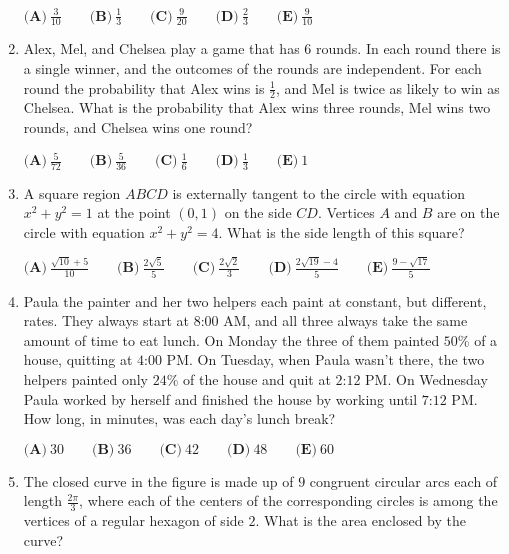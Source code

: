 \documentclass{article}
\begin{document}
\begin{enumerate}[label=\arabic*., itemsep=0.5em]
$ \textbf{(A)}\ \frac{3}{10}\qquad\textbf{(B)}\ \frac{1}{3}\qquad\textbf{(C)}\ \frac{9}{20}\qquad\textbf{(D)}\ \frac{2}{3}\qquad\textbf{(E)}\ \frac{9}{10} $\par \vspace{0.5em}\item Alex, Mel, and Chelsea play a game that has $6$ rounds.  In each round there is a single winner, and the outcomes of the rounds are independent.  For each round the probability that Alex wins is $\frac{1}{2}$, and Mel is twice as likely to win as Chelsea.  What is the probability that Alex wins three rounds, Mel wins two rounds, and Chelsea wins one round?

$ \textbf{(A)}\ \frac{5}{72}\qquad\textbf{(B)}\ \frac{5}{36}\qquad\textbf{(C)}\ \frac{1}{6}\qquad\textbf{(D)}\ \frac{1}{3}\qquad\textbf{(E)}\ 1 $\par \vspace{0.5em}\item A square region $ABCD$ is externally tangent to the circle with equation $x^2+y^2=1$ at the point $(0,1)$ on the side $CD$.  Vertices $A$ and $B$ are on the circle with equation $x^2+y^2=4$.  What is the side length of this square?

$ \textbf{(A)}\ \frac{\sqrt{10}+5}{10}\qquad\textbf{(B)}\ \frac{2\sqrt{5}}{5}\qquad\textbf{(C)}\ \frac{2\sqrt{2}}{3}\qquad\textbf{(D)}\ \frac{2\sqrt{19}-4}{5}\qquad\textbf{(E)}\ \frac{9-\sqrt{17}}{5} $\par \vspace{0.5em}\item Paula the painter and her two helpers each paint at constant, but different, rates.  They always start at $\text{8:00 AM}$, and all three always take the same amount of time to eat lunch.  On Monday the three of them painted $50\%$ of a house, quitting at $\text{4:00 PM}$.  On Tuesday, when Paula wasn't there, the two helpers painted only $24\%$ of the house and quit at $\text{2:12 PM}$.  On Wednesday Paula worked by herself and finished the house by working until $\text{7:12 PM}$.  How long, in minutes, was each day's lunch break?

$ \textbf{(A)}\ 30
\qquad\textbf{(B)}\ 36
\qquad\textbf{(C)}\ 42
\qquad\textbf{(D)}\ 48
\qquad\textbf{(E)}\ 60
 $\par \vspace{0.5em}\item The closed curve in the figure is made up of $9$ congruent circular arcs each of length $\frac{2\pi}{3}$, where each of the centers of the corresponding circles is among the vertices of a regular hexagon of side $2$. What is the area enclosed by the curve? 



\end{enumerate}
\end{document}
